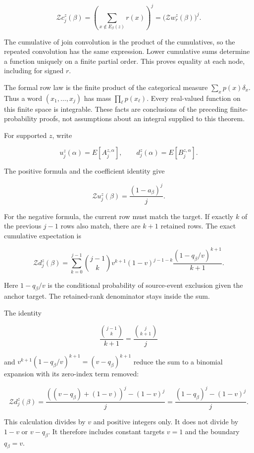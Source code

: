\[
\mathcal Zc_j^z(\beta)
=\left(\sum_{x\notin E_\beta(z)}r(x)\right)^j
=\bigl(\mathcal Zw_r^z(\beta)\bigr)^j.
\]

The cumulative of join convolution is the product of the cumulatives, so the repeated convolution has the same expression. Lower cumulative sums determine a function uniquely on a finite partial order. This proves equality at each node, including for signed \(r\).

\label{expectations-under-the-actual-row-law}

The formal row law is the finite product of the categorical measure \(\sum_xp(x)\delta_x\). Thus a word \((x_1,\ldots,x_j)\) has mass \(\prod_\ell p(x_\ell)\). Every real-valued function on this finite space is integrable. These facts are conclusions of the preceding finite-probability proofs, not assumptions about an integral supplied to this theorem.

For supported \(z\), write

\[
u_j^z(\alpha)=E[A_j^{z,\alpha}],\qquad
d_j^z(\alpha)=E[B_j^{z,\alpha}].
\]

The positive formula and the coefficient identity give

\[
\mathcal Zu_j^z(\beta)=\frac{(1-a_\beta)^j}{j}.
\]

For the negative formula, the current row must match the target. If exactly \(k\) of the previous \(j-1\) rows also match, there are \(k+1\) retained rows. The exact cumulative expectation is

\[
\mathcal Zd_j^z(\beta)=
\sum_{k=0}^{j-1}\binom{j-1}{k}
v^{k+1}(1-v)^{j-1-k}
\frac{(1-q_\beta/v)^{k+1}}{k+1}.
\]

Here \(1-q_\beta/v\) is the conditional probability of source-event exclusion given the anchor target. The retained-rank denominator stays inside the sum.

The identity

\[
\frac{\binom{j-1}{k}}{k+1}=\frac{\binom{j}{k+1}}{j}
\]

and \(v^{k+1}(1-q_\beta/v)^{k+1}=(v-q_\beta)^{k+1}\) reduce the sum to a binomial expansion with its zero-index term removed:

\[
\mathcal Zd_j^z(\beta)
=\frac{((v-q_\beta)+(1-v))^j-(1-v)^j}{j}
=\frac{(1-q_\beta)^j-(1-v)^j}{j}.
\]

This calculation divides by \(v\) and positive integers only. It does not divide by \(1-v\) or \(v-q_\beta\). It therefore includes constant targets \(v=1\) and the boundary \(q_\beta=v\).

